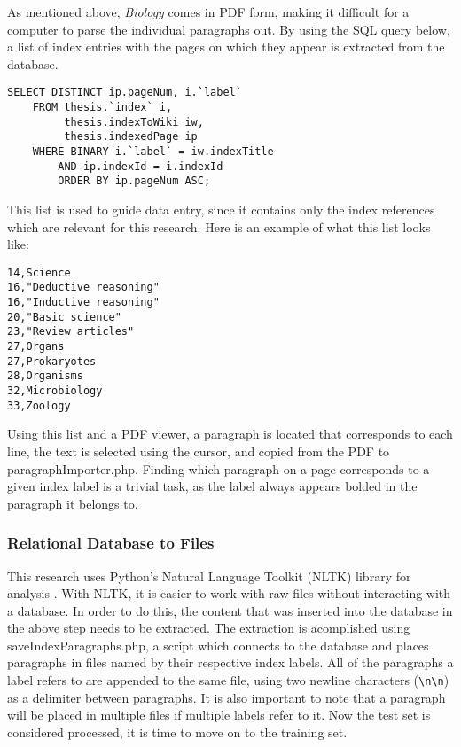As mentioned above, {\it Biology} comes in PDF form, making it difficult for a computer to parse the individual paragraphs out.
By using the SQL query below, a list of index entries with the pages on which they appear is extracted from the database.

\begin{lstlisting}
SELECT DISTINCT ip.pageNum, i.`label`
    FROM thesis.`index` i,
         thesis.indexToWiki iw,
         thesis.indexedPage ip
    WHERE BINARY i.`label` = iw.indexTitle
        AND ip.indexId = i.indexId
        ORDER BY ip.pageNum ASC;
\end{lstlisting}

This list is used to guide data entry, since it contains only the index references which are relevant for this research.
Here is an example of what this list looks like:

\begin{multicols}{2}
\begin{verbatim}
14,Science
16,"Deductive reasoning"
16,"Inductive reasoning"
20,"Basic science"
23,"Review articles"
27,Organs
27,Prokaryotes
28,Organisms
32,Microbiology
33,Zoology
\end{verbatim}
\end{multicols}

Using this list and a PDF viewer, a paragraph is located that corresponds to each line, the text is selected using the cursor, and copied from the PDF to paragraphImporter.php.
Finding which paragraph on a page corresponds to a given index label is a trivial task, as the label always appears bolded in the paragraph it belongs to.

\subsubsection{Relational Database to Files}
\label{subsubsec:RDB2F}

This research uses Python's Natural Language Toolkit (NLTK) library for analysis \cite{nltk}.
With NLTK, it is easier to work with raw files without interacting with a database.
In order to do this, the content that was inserted into the database in the above step needs to be extracted.
The extraction is acomplished using saveIndexParagraphs.php, a script which connects to the database and places paragraphs in files named by their respective index labels.
All of the paragraphs a label refers to are appended to the same file, using two newline characters ({\tt{\textbackslash}n{\textbackslash}n}) as a delimiter between paragraphs.
It is also important to note that a paragraph will be placed in multiple files if multiple labels refer to it.
Now the test set is considered processed, it is time to move on to the training set.

